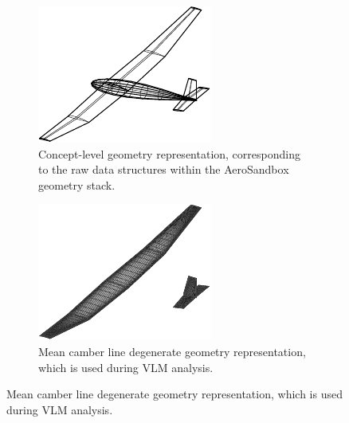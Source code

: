 \begin{figure}[h]
    \centering
    \begin{subfigure}{0.32\textwidth}
        \includegraphics[width=\textwidth]{../figures/geometry_concept-crop.pdf}
        \caption{Concept-level geometry representation, corresponding to the raw data structures within the AeroSandbox geometry stack.}
        \label{fig:geometry_concept}
    \end{subfigure}
    \begin{subfigure}{0.32\textwidth}
        \includegraphics[width=\textwidth]{../figures/geometry_mean_camber-crop.pdf}
        \caption{Mean camber line degenerate geometry representation, which is used during VLM analysis.}

\end{subfigure}
\end{figure}
